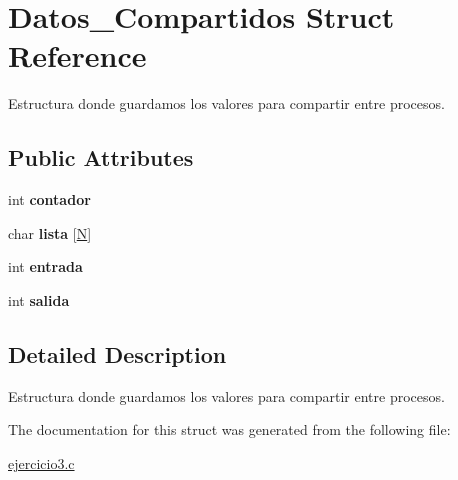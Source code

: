 \hypertarget{structDatos__Compartidos}{}\section{Datos\+\_\+\+Compartidos Struct Reference}
\label{structDatos__Compartidos}


Estructura donde guardamos los valores para compartir entre procesos.  


\subsection*{Public Attributes}
\begin{DoxyCompactItemize}
\item 
\mbox{\label{structDatos__Compartidos_a9a24a4246a3386b02f35bed66dd49e56}} 
int {\bfseries contador}
\item 
\mbox{\label{structDatos__Compartidos_a096701f1a053246384ae923e2db4b287}} 
char {\bfseries lista} \mbox{[}\mbox{\hyperlink{ejercicio3_8c_a0240ac851181b84ac374872dc5434ee4}{N}}\mbox{]}
\item 
\mbox{\label{structDatos__Compartidos_a9ad43b97ad296a4c84c9c5e13025fcf8}} 
int {\bfseries entrada}
\item 
\mbox{\label{structDatos__Compartidos_af309e14b34094b635aeada2a942ec241}} 
int {\bfseries salida}
\end{DoxyCompactItemize}


\subsection{Detailed Description}
Estructura donde guardamos los valores para compartir entre procesos. 

The documentation for this struct was generated from the following file\+:\begin{DoxyCompactItemize}
\item 
\mbox{\hyperlink{ejercicio3_8c}{ejercicio3.\+c}}\end{DoxyCompactItemize}
